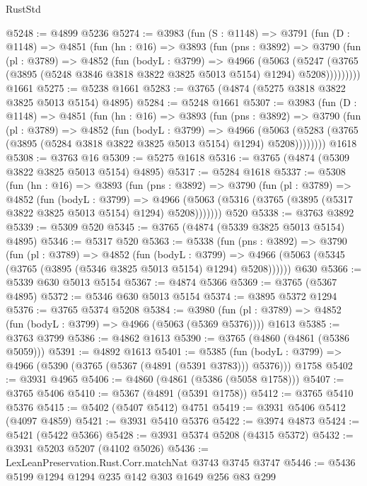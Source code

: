 \begin{lexlean}{RustStd}
\begin{coremodule}
@5248 := @4899 @5236
@5274 := @3983
    (fun (S : @1148) =>
    @3791
      (fun (D : @1148) =>
      @4851
        (fun (hn : @16) =>
        @3893
          (fun (pns : @3892) =>
          @3790
            (fun (pl : @3789) =>
            @4852
              (fun (bodyL : @3799) =>
              @4966
                (@5063
                  (@5247
                    (@3765 (@3895 (@5248 @3846 @3818 @3822 @3825 @5013 @5154) @1294) @5208)))))))))
    @1661
@5275 := @5238 @1661
@5283 := @3765 (@4874 (@5275 @3818 @3822 @3825 @5013 @5154) @4895)
@5284 := @5248 @1661
@5307 := @3983
    (fun (D : @1148) =>
    @4851
      (fun (hn : @16) =>
      @3893
        (fun (pns : @3892) =>
        @3790
          (fun (pl : @3789) =>
          @4852
            (fun (bodyL : @3799) =>
            @4966
              (@5063 (@5283 (@3765 (@3895 (@5284 @3818 @3822 @3825 @5013 @5154) @1294) @5208))))))))
    @1618
@5308 := @3763 @16
@5309 := @5275 @1618
@5316 := @3765 (@4874 (@5309 @3822 @3825 @5013 @5154) @4895)
@5317 := @5284 @1618
@5337 := @5308
    (fun (hn : @16) =>
    @3893
      (fun (pns : @3892) =>
      @3790
        (fun (pl : @3789) =>
        @4852
          (fun (bodyL : @3799) =>
          @4966 (@5063 (@5316 (@3765 (@3895 (@5317 @3822 @3825 @5013 @5154) @1294) @5208)))))))
    @520
@5338 := @3763 @3892
@5339 := @5309 @520
@5345 := @3765 (@4874 (@5339 @3825 @5013 @5154) @4895)
@5346 := @5317 @520
@5363 := @5338
    (fun (pns : @3892) =>
    @3790
      (fun (pl : @3789) =>
      @4852
        (fun (bodyL : @3799) =>
        @4966 (@5063 (@5345 (@3765 (@3895 (@5346 @3825 @5013 @5154) @1294) @5208))))))
    @630
@5366 := @5339 @630 @5013 @5154
@5367 := @4874 @5366
@5369 := @3765 (@5367 @4895)
@5372 := @5346 @630 @5013 @5154
@5374 := @3895 @5372 @1294
@5376 := @3765 @5374 @5208
@5384 := @3980
    (fun (pl : @3789) => @4852 (fun (bodyL : @3799) => @4966 (@5063 (@5369 @5376))))
    @1613
@5385 := @3763 @3799
@5386 := @4862 @1613
@5390 := @3765 (@4860 (@4861 (@5386 @5059)))
@5391 := @4892 @1613
@5401 := @5385
    (fun (bodyL : @3799) => @4966 (@5390 (@3765 (@5367 (@4891 (@5391 @3783))) @5376)))
    @1758
@5402 := @3931 @4965
@5406 := @4860 (@4861 (@5386 (@5058 @1758)))
@5407 := @3765 @5406
@5410 := @5367 (@4891 (@5391 @1758))
@5412 := @3765 @5410 @5376
@5415 := @5402 (@5407 @5412) @4751
@5419 := @3931 @5406 @5412 (@4097 @4859)
@5421 := @3931 @5410 @5376
@5422 := @3974 @4873
@5424 := @5421 (@5422 @5366)
@5428 := @3931 @5374 @5208 (@4315 @5372)
@5432 := @3931 @5203 @5207 (@4102 @5026)
@5436 := LexLeanPreservation.Rust.Corr.matchNat @3743 @3745 @3747
@5446 := @5436 @5199 @1294 @1294 @235 @142 @303 @1649 @256 @83 @299

\end{coremodule}
\end{lexlean}
